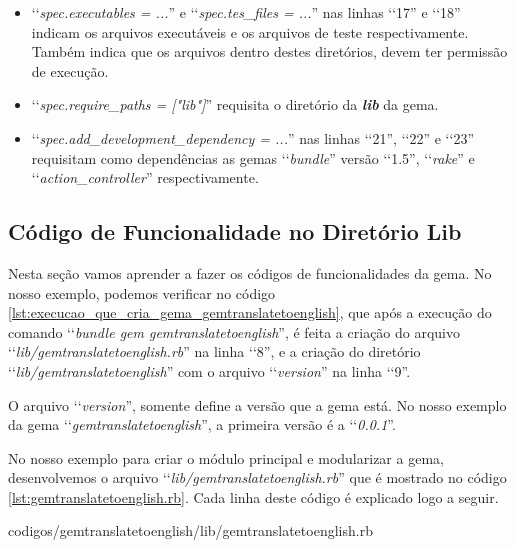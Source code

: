 \begin{itemize}
 \item ‘‘\emph{spec.executables = ...}'' e ‘‘\emph{spec.tes\_files = ...}'' nas linhas ‘‘17'' e ‘‘18''
 indicam os arquivos executáveis e os arquivos de teste respectivamente. Também indica que os arquivos dentro
 destes diretórios, devem ter permissão de execução.

 \item ‘‘\emph{spec.require\_paths = ["lib"]}'' requisita o diretório da \emph{\textbf{lib}} da gema.

 \item ‘‘\emph{spec.add\_development\_dependency = ...}'' nas linhas ‘‘21'', ‘‘22'' e ‘‘23'' requisitam como
 dependências as gemas ‘‘\emph{bundle}'' versão ‘‘1.5'', ‘‘\emph{rake}'' e ‘‘\emph{action\_controller}''
 respectivamente.

\end{itemize}


\subsection{Código de Funcionalidade no Diretório Lib}
\label{subsection:codigo_de_funcionalidade_no_diretorio_lib}


Nesta seção vamos aprender a fazer os códigos de funcionalidades da gema. No nosso exemplo,
podemos verificar no código \ref{lst:execucao_que_cria_gema_gemtranslatetoenglish}, que após a
execução do comando ‘‘\emph{bundle gem gemtranslatetoenglish}'', é feita a criação do arquivo
‘‘\emph{lib/gemtranslatetoenglish.rb}'' na linha ‘‘8'', e a criação do diretório
‘‘\emph{lib/gemtranslatetoenglish}'' com o arquivo ‘‘\emph{version}'' na linha ‘‘9''.

O arquivo ‘‘\emph{version}'', somente define a versão que a gema está. No nosso exemplo da gema
‘‘\emph{gemtranslatetoenglish}'', a primeira versão é a ‘‘\emph{0.0.1}''.

No nosso exemplo para criar o módulo principal e modularizar a gema, desenvolvemos o arquivo
‘‘\emph{lib/gemtranslatetoenglish.rb}'' que é mostrado no código
\ref{lst:gemtranslatetoenglish.rb}. Cada linha deste código é explicado logo a seguir.


{codigos/gemtranslatetoenglish/lib/gemtranslatetoenglish.rb}

